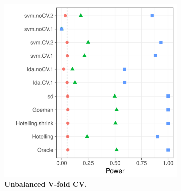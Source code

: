 \documentclass[12pt,a4paper]{article}
\begin{document}
\begin{figure}[h]
	\centering
	\caption{
		The power of the permutation test with various test statistics. 
		The power on the $x$ axis. 
		Effects are color and shape coded. 
		The various statistics on the $y$ axis. 
		Their details are given in Table~\ref{tab:collected}. 
		Effects vary over $c=0$ (red circle), $c=1/4$ (green triangle), and $c=1/2$ (blue square). 
		Simulation details in Section~\ref{sec:simulation_details}.
		Cross-validation was performed with balanced and unbalanced data folding; see sub-captions.}	
	\label{fig:simulation_1}
	\begin{subfigure}{.5\textwidth}
		\centering
		\includegraphics[width=1\linewidth]{"art/file3"}
		\caption{\textbf{Unbalanced V-fold CV.}} 
		\label{fig:file3}
	\end{subfigure}%
	\begin{subfigure}{.5\textwidth}
		\centering

\end{subfigure}
\end{figure}
\end{document}
